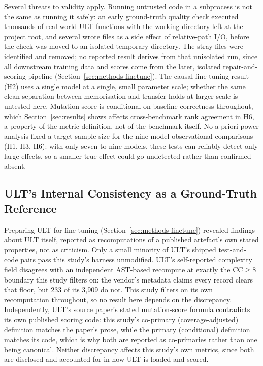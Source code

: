 Several threats to validity apply. Running untrusted code in a subprocess is not the same as running it safely: an early ground-truth quality check executed thousands of real-world ULT functions with the working directory left at the project root, and several wrote files as a side effect of relative-path I/O, before the check was moved to an isolated temporary directory. The stray files were identified and removed; no reported result derives from that unisolated run, since all downstream training data and scores come from the later, isolated repair-and-scoring pipeline (Section~\ref{sec:methods-finetune}). The causal fine-tuning result (H2) uses a single model at a single, small parameter scale; whether the same clean separation between memorisation and transfer holds at larger scale is untested here. Mutation score is conditional on baseline correctness throughout, which Section~\ref{sec:results} shows affects cross-benchmark rank agreement in H6, a property of the metric definition, not of the benchmark itself. No a-priori power analysis fixed a target sample size for the nine-model observational comparisons (H1, H3, H6): with only seven to nine models, these tests can reliably detect only large effects, so a smaller true effect could go undetected rather than confirmed absent.

\enlargethispage{1\baselineskip}
\subsection{ULT's Internal Consistency as a Ground-Truth Reference}
\label{sec:discussion-ult}
Preparing ULT for fine-tuning (Section~\ref{sec:methods-finetune}) revealed findings about ULT itself, reported as recomputations of a published artefact's own stated properties, not as criticism. Only a small minority of ULT's shipped test-and-code pairs pass this study's harness unmodified. ULT's self-reported complexity field disagrees with an independent AST-based recompute at exactly the CC$\geq$8 boundary this study filters on: the vendor's metadata claims every record clears that floor, but 233 of its 3,909 do not. This study filters on its own recomputation throughout, so no result here depends on the discrepancy. Independently, ULT's source paper's stated mutation-score formula contradicts its own published scoring code: this study's co-primary (coverage-adjusted) definition matches the paper's prose, while the primary (conditional) definition matches its code, which is why both are reported as co-primaries rather than one being canonical. Neither discrepancy affects this study's own metrics, since both are disclosed and accounted for in how ULT is loaded and scored.
